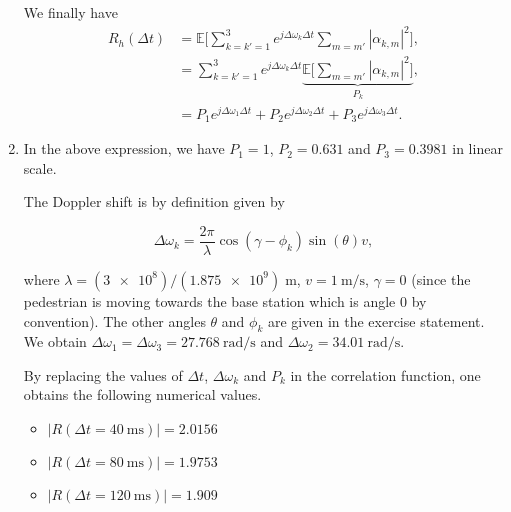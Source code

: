 \documentclass [a4paper, 11pt] {article}
\begin{document}
\begin{solution}
\begin{enumerate}
\begin{itemize}
        \end{itemize}

        We finally have
        \begin{align}
        R_h(\Delta t) &= \mathbb{E}\Bigg[ \sum_{k = k'=1}^{3} e^{j\Delta \omega_{k} \Delta t} \sum_{m = m'} | \alpha_{k,m}|^2 \Bigg], \\
        &=  \sum_{k = k'=1}^{3} e^{j\Delta \omega_{k} \Delta t} \underbrace{\mathbb{E}\Bigg[\sum_{m = m'} | \alpha_{k,m}|^2 \Bigg]}_{P_k},\\
        &= P_1 e^{j\Delta \omega_{1} \Delta t} + P_2 e^{j\Delta \omega_{2} \Delta t} +P_3 e^{j\Delta \omega_{3} \Delta t}.
        \end{align}

        \item In the above expression, we have $P_1 = 1$, $P_2 = 0.631$ and $P_3 = 0.3981$ in linear scale.

        The Doppler shift is by definition given by

    \begin{equation}\Delta \omega_k = \dfrac{2\pi}{\lambda}\cos(\gamma - \phi_{k})\sin(\theta)v,
    \end{equation}

        where $\lambda = (\num{3e8})/(\num{1.875e9})\;\si{\meter}$, $v = \SI{1}{\meter\per\second}$, $\gamma = 0$ (since the pedestrian is moving towards the base station which is angle 0 by convention). The other angles $\theta$ and $\phi_k$ are given in the exercise statement. We obtain $\Delta \omega_1 = \Delta \omega_3 = \SI{27.768}{\radian\per\second}$ and  $\Delta \omega_2 = \SI{34.01}{\radian\per\second}$.

        By replacing the values of $\Delta t$, $\Delta \omega_k$ and $P_k$ in the correlation function, one obtains the following numerical values.

        \medskip

        \begin{minipage}{0.45\textwidth}
                \begin{itemize}
                \item[] $|R(\Delta t = \SI{40}{\milli\second})| = 2.0156$
                \item[] $|R(\Delta t = \SI{80}{\milli\second})| = 1.9753$
                \item[] $|R(\Delta t = \SI{120}{\milli\second})| = 1.909$


\end{itemize}
\end{minipage}
\end{enumerate}
\end{solution}
\end{document}
